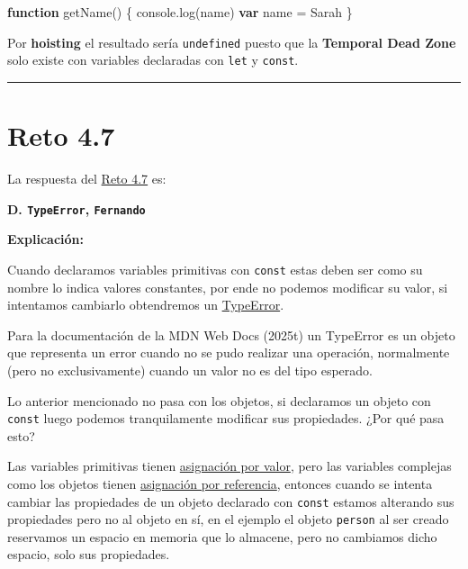 \documentclass[
  letterpaper,
  DIV=11,
  numbers=noendperiod]{scrreprt}
\newenvironment{Shaded}{\begin{snugshade}}{\end{snugshade}}
\newcommand{\BuiltInTok}[1]{\textcolor[rgb]{0.00,0.23,0.31}{#1}}
\newcommand{\FunctionTok}[1]{\textcolor[rgb]{0.28,0.35,0.67}{#1}}
\newcommand{\KeywordTok}[1]{\textcolor[rgb]{0.00,0.23,0.31}{\textbf{#1}}}
\newcommand{\NormalTok}[1]{\textcolor[rgb]{0.00,0.23,0.31}{#1}}
\newcommand{\OperatorTok}[1]{\textcolor[rgb]{0.37,0.37,0.37}{#1}}
\newcommand{\StringTok}[1]{\textcolor[rgb]{0.13,0.47,0.30}{#1}}
\begin{document}
\begin{Shaded}
\begin{Highlighting}[]
\KeywordTok{function} \FunctionTok{getName}\NormalTok{() \{}
  \BuiltInTok{console}\OperatorTok{.}\FunctionTok{log}\NormalTok{(name)}
  \KeywordTok{var}\NormalTok{ name }\OperatorTok{=} \StringTok{\textquotesingle{}Sarah\textquotesingle{}}
\NormalTok{\}}
\end{Highlighting}
\end{Shaded}

Por \textbf{hoisting} el resultado sería \texttt{undefined} puesto que
la \textbf{Temporal Dead Zone} solo existe con variables declaradas con
\texttt{let} y \texttt{const}.

\begin{center}\rule{0.5\linewidth}{0.5pt}\end{center}

\section{Reto 4.7}\label{sec-sol-cap4-reto7}

La respuesta del \hyperref[sec-cap4-reto7]{Reto 4.7} es:

\textbf{D. \texttt{TypeError}, \texttt{Fernando}}

\textbf{Explicación:}

Cuando declaramos variables primitivas con \texttt{const} estas deben
ser como su nombre lo indica valores constantes, por ende no podemos
modificar su valor, si intentamos cambiarlo obtendremos un
\hyperref[glos-typeerror]{TypeError}.

Para la documentación de la MDN Web Docs (2025t) un TypeError es un
objeto que representa un error cuando no se pudo realizar una operación,
normalmente (pero no exclusivamente) cuando un valor no es del tipo
esperado.

Lo anterior mencionado no pasa con los objetos, si declaramos un objeto
con \texttt{const} luego podemos tranquilamente modificar sus
propiedades. ¿Por qué pasa esto?

Las variables primitivas tienen
\hyperref[glos-asignacion_por_valor]{asignación por valor}, pero las
variables complejas como los objetos tienen
\hyperref[glos-asignacion_por_referencia]{asignación por referencia},
entonces cuando se intenta cambiar las propiedades de un objeto
declarado con \texttt{const} estamos alterando sus propiedades pero no
al objeto en sí, en el ejemplo el objeto \texttt{person} al ser creado
reservamos un espacio en memoria que lo almacene, pero no cambiamos
dicho espacio, solo sus propiedades.
\end{document}
